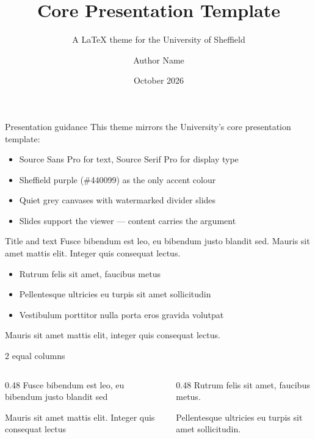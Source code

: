 \documentclass[aspectratio=169]{beamer}
\title{Core Presentation Template}
\subtitle{A LaTeX theme for the University of Sheffield}
\author{Author Name}
\institute{The University of Sheffield}
\date{October 2026}
\begin{document}
\SheffieldTitlePage

\begin{frame}{Presentation guidance}
  This theme mirrors the University's core presentation template:
  \begin{itemize}
    \item Source Sans Pro for text, Source Serif Pro for display type
    \item Sheffield purple (\#440099) as the only accent colour
    \item Quiet grey canvases with watermarked divider slides
    \item Slides support the viewer --- content carries the argument
  \end{itemize}
\end{frame}

\begin{frame}{Title and text}
  Fusce bibendum est leo, eu bibendum justo blandit sed. Mauris sit amet
  mattis elit. Integer quis consequat lectus.

  \begin{itemize}
    \item Rutrum felis sit amet, faucibus metus
    \item Pellentesque ultricies eu turpis sit amet sollicitudin
    \item Vestibulum porttitor nulla porta eros gravida volutpat
  \end{itemize}

  Mauris sit amet mattis elit, \alert{integer quis consequat lectus}.
\end{frame}


\begin{frame}{2 equal columns}
  \begin{columns}[t,onlytextwidth]
    \begin{column}{0.48\textwidth}
      Fusce bibendum est leo, eu bibendum justo blandit sed

      \medskip
      Mauris sit amet mattis elit. Integer quis consequat lectus
    \end{column}
    \begin{column}{0.48\textwidth}
      Rutrum felis sit amet, faucibus metus.

      \medskip
      Pellentesque ultricies eu turpis sit amet sollicitudin.
    \end{column}
  \end{columns}
\end{frame}
\end{document}
